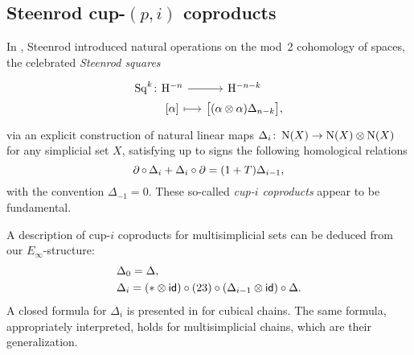 \subsection{Steenrod cup-$(p,i)$ coproducts}\label{ss:cup coproducts}

In \cite{steenrod1947products}, Steenrod introduced natural operations on the mod~2 cohomology of spaces, the celebrated \textit{Steenrod squares}
\[
\begin{tikzcd} [column sep=small, row sep=0]
	\Sq^k \colon &[-20] \rH^{-n} \arrow[r] & \rH^{-n-k} \\ &
	{[\alpha]} \arrow[r, mapsto] & \big[ (\alpha \ot \alpha) \Delta_{n-k} \big],
\end{tikzcd}
\]
via an explicit construction of natural linear maps $\Delta_i \colon \operatorname{N}(X) \to \operatorname{N}(X) \otimes \operatorname{N}(X)$ for any simplicial set $X$, satisfying up to signs the following homological relations
\begin{equation}\label{e:cupi homological relations}
	\operatorname{\partial} \circ \, \Delta_i + \Delta_i \circ \operatorname{\partial} =
	(1 + T) \Delta_{i-1},
\end{equation}
with the convention $\Delta_{-1} = 0$.
These so-called \textit{cup-$i$ coproducts} appear to be fundamental.

A description of cup-$i$ coproducts for multisimplicial sets can be deduced from our $E_\infty$-structure:
\begin{equation}\label{e:recursive cup-i}
	\begin{split}
		& \Delta_0 = \Delta, \\
		& \Delta_i =
		(\ast \otimes \mathsf{id}) \circ (23) \circ (\Delta_{i-1} \otimes \mathsf{id}) \circ \Delta.
	\end{split}
\end{equation}
A closed formula for $\Delta_i$ is presented in \cite[\S4.8]{medina2022cube_einfty} for cubical chains.
The same formula, appropriately interpreted, holds for multisimplicial chains, which are their generalization.

